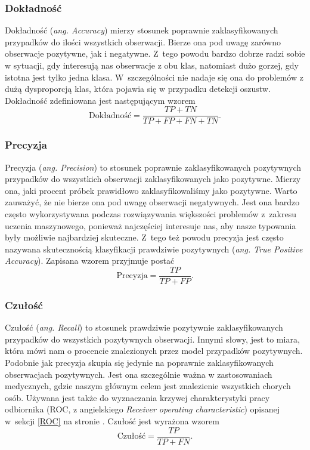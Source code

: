 \documentclass[inzynierska]{pwr_wmat_praca_dyplomowa}
\theoremstyle{plain}
\numberwithin{theorem}{chapter}
\theoremstyle{definition}
\numberwithin{theorem}{chapter}
\begin{document}
\subsubsection{Dokładność}
Dokładność (\textit{ang. Accuracy}) mierzy stosunek poprawnie zaklasyfikowanych przypadków do ilości wszystkich obserwacji. Bierze ona pod uwagę zarówno obserwacje pozytywne, jak i negatywne. Z~tego powodu bardzo dobrze radzi sobie w sytuacji, gdy interesują nas obserwacje z obu klas, natomiast dużo gorzej, gdy istotna jest tylko jedna klasa. W~szczególności nie nadaje się ona do problemów z dużą dysproporcją klas, która pojawia się w przypadku detekcji oszustw. Dokładność zdefiniowana jest następującym wzorem
$$ \text{Dokładność} = \frac{TP + TN}{TP + FP + FN + TN} \text{.}$$

\subsubsection{Precyzja}
Precyzja (\textit{ang. Precision}) to stosunek poprawnie zaklasyfikowanych pozytywnych przypadków do wszystkich obserwacji zaklasyfikowanych jako pozytywne. Mierzy ona, jaki procent próbek prawidłowo zaklasyfikowaliśmy jako pozytywne. Warto zauważyć, że nie bierze ona pod uwagę obserwacji negatywnych. Jest ona bardzo często wykorzystywana podczas rozwiązywania większości problemów z~zakresu uczenia maszynowego, ponieważ najczęściej interesuje nas, aby nasze typowania były możliwie najbardziej skuteczne. Z~tego też powodu precyzja jest często nazywana skutecznością klasyfikacji prawdziwie pozytywnych (\textit{ang. True Positive Accuracy}). Zapisana wzorem przyjmuje postać
$$ \text{Precyzja} = \frac{TP}{TP + FP} \text{.}$$

\subsubsection{Czułość}
Czułość (\textit{ang. Recall}) to stosunek prawdziwie pozytywnie zaklasyfikowanych przypadków do wszystkich pozytywnych obserwacji. Innymi słowy, jest to miara, która mówi nam o procencie znalezionych przez model przypadków pozytywnych. Podobnie jak precyzja skupia się jedynie na poprawnie zaklasyfikowanych obserwacjach pozytywnych. Jest ona szczególnie ważna w zastosowaniach medycznych, gdzie naszym głównym celem jest znalezienie wszystkich chorych osób. Używana jest także do wyznaczania krzywej charakterystyki pracy odbiornika (ROC, z angielskiego \textit{Receiver operating characteristic}) opisanej w~sekcji \ref{ROC} na stronie \pageref{ROC}. Czułość jest wyrażona wzorem
$$ \text{Czułość}= \frac{TP}{TP + FN} \text{.}$$
\end{document}
